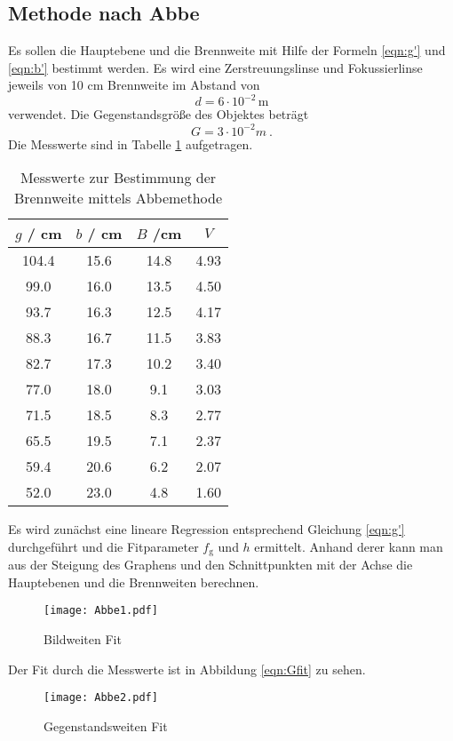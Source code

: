 \subsection{Methode nach Abbe}
Es sollen die Hauptebene und die Brennweite mit Hilfe der Formeln \eqref{eqn:g'} und \eqref{eqn:b'} bestimmt werden. Es wird eine Zerstreuungslinse und Fokussierlinse jeweils von 10 cm Brennweite im Abstand von
\begin{equation}
  d = 6 \cdot 10^{-2} \, \text{m}
  \label{eqn:d}
\end{equation}
verwendet. Die Gegenstandsgröße des Objektes beträgt 
\begin{equation}
  G = 3 \cdot 10^{-2} m \ .
  \label{eqn:G}
\end{equation}
Die Messwerte sind in Tabelle \ref{tab:mabbe} aufgetragen. 
\begin{table}
  \centering
  \begin{tabular}{c c c c}
    \toprule
    	$g$ / cm & $b$ / cm & $B$ /cm & $V$ \\
    \midrule	
	104.4	& 15.6	& 14.8	& 4.93	\\
	99.0	& 16.0	& 13.5	& 4.50	\\
	93.7	& 16.3	& 12.5	& 4.17	\\
	88.3	& 16.7	& 11.5	& 3.83	\\
	82.7	& 17.3	& 10.2	& 3.40	\\
	77.0	& 18.0	& 9.1	& 3.03	\\
	71.5	& 18.5	& 8.3	& 2.77	\\
	65.5	& 19.5	& 7.1	& 2.37	\\
	59.4	& 20.6	& 6.2	& 2.07	\\
	52.0	& 23.0	& 4.8	& 1.60	\\
    \bottomrule
  \end{tabular}
  \caption{Messwerte zur Bestimmung der Brennweite mittels Abbemethode}
  \label{tab:mabbe}
\end{table}
Es wird zunächst eine lineare Regression entsprechend Gleichung \eqref{eqn:g'} durchgeführt und die Fitparameter $f_\text{g}$ und $h$ ermittelt. Anhand derer kann man aus der Steigung des Graphens und den Schnittpunkten mit der Achse die Hauptebenen und die Brennweiten berechnen.
\begin{figure}
  \centering
    \texttt{[image: Abbe1.pdf]}
  \caption{Bildweiten Fit}
  \label{fig:Gfit}
\end{figure}
Der Fit durch die Messwerte ist in Abbildung \ref{eqn:Gfit} zu sehen.
\begin{figure}
  \centering
  \texttt{[image: Abbe2.pdf]}
  \caption{Gegenstandsweiten Fit}
  \label{fig:Bfit}
\end{figure}
